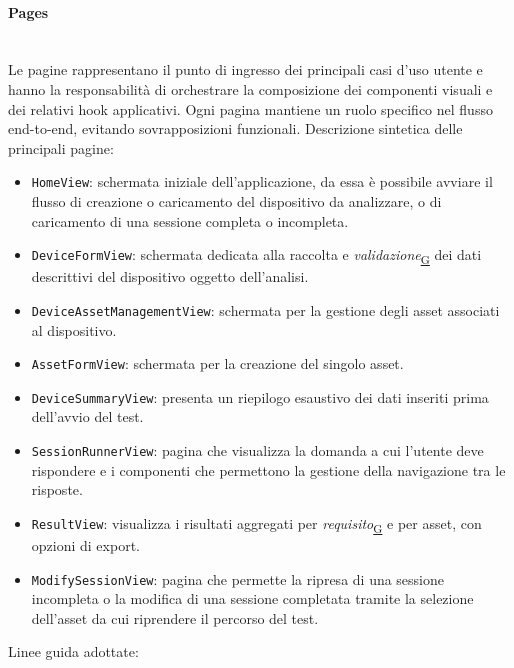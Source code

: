\documentclass[a4paper,12pt]{article}
\begin{document}
            \paragraph{Pages}\mbox{}\\
                Le pagine rappresentano il punto di ingresso dei principali casi d'uso utente e hanno la responsabilità di orchestrare la composizione dei componenti visuali e dei relativi hook applicativi.
                Ogni pagina mantiene un ruolo specifico nel flusso end-to-end, evitando sovrapposizioni funzionali.
                Descrizione sintetica delle principali pagine:
                \begin{itemize}
                    \item \texttt{HomeView}: schermata iniziale dell'applicazione, da essa è possibile avviare il flusso di creazione o caricamento del dispositivo da analizzare, o di caricamento di una sessione completa o incompleta.
                    \item \texttt{DeviceFormView}: schermata dedicata alla raccolta e \textit{validazione}\textsubscript{\href{https://atlasteam9.github.io/Atlas/glossario.html\#Validazione}{G}} dei dati descrittivi del dispositivo oggetto dell'analisi.
                    \item \texttt{DeviceAssetManagementView}: schermata per la gestione degli asset associati al dispositivo.
                    \item \texttt{AssetFormView}: schermata per la creazione del singolo asset.
                    \item \texttt{DeviceSummaryView}: presenta un riepilogo esaustivo dei dati inseriti prima dell'avvio del test.
                    \item \texttt{SessionRunnerView}: pagina che visualizza la domanda a cui l'utente deve rispondere e i componenti che permettono la gestione della navigazione tra le risposte.
                    \item \texttt{ResultView}: visualizza i risultati aggregati per \textit{requisito}\textsubscript{\href{https://atlasteam9.github.io/Atlas/glossario.html\#Requisito}{G}} e per asset, con opzioni di export.
                    \item \texttt{ModifySessionView}: pagina che permette la ripresa di una sessione incompleta o la modifica di una sessione completata tramite la selezione dell'asset da cui riprendere il percorso del test.
                \end{itemize}
                Linee guida adottate:
\end{document}

